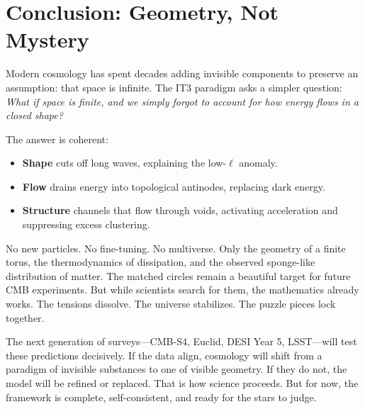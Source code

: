 \documentclass[12pt,a4paper]{report}
\begin{document}
\chapter{Conclusion: Geometry, Not Mystery}
Modern cosmology has spent decades adding invisible components to preserve an assumption: that space is infinite. The IT3 paradigm asks a simpler question: \textit{What if space is finite, and we simply forgot to account for how energy flows in a closed shape?}

The answer is coherent:
\begin{itemize}
    \item \textbf{Shape} cuts off long waves, explaining the low-$\ell$ anomaly.
    \item \textbf{Flow} drains energy into topological antinodes, replacing dark energy.
    \item \textbf{Structure} channels that flow through voids, activating acceleration and suppressing excess clustering.
\end{itemize}

No new particles. No fine-tuning. No multiverse. Only the geometry of a finite torus, the thermodynamics of dissipation, and the observed sponge-like distribution of matter. The matched circles remain a beautiful target for future CMB experiments. But while scientists search for them, the mathematics already works. The tensions dissolve. The universe stabilizes. The puzzle pieces lock together.

The next generation of surveys---CMB-S4, Euclid, DESI Year 5, LSST---will test these predictions decisively. If the data align, cosmology will shift from a paradigm of invisible substances to one of visible geometry. If they do not, the model will be refined or replaced. That is how science proceeds. But for now, the framework is complete, self-consistent, and ready for the stars to judge.
\end{document}
